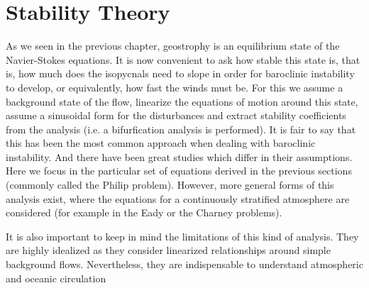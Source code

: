 \section{Stability Theory}
\label{s:stability}

As we seen in the previous chapter, geostrophy is an equilibrium state of the Navier-Stokes equations. It is now convenient to ask how stable this state is, that is, how much does the isopycnals need to slope in order for baroclinic instability to develop, or equivalently, how fast the winds must be. For this we assume a background state of the flow, linearize the equations of motion around this state, assume a sinusoidal form for the disturbances and extract stability coefficients from the analysis (i.e. a bifurfication analysis is performed). It is fair to say that this has been the most common approach when dealing with baroclinic instability. And there have been great studies which differ in their assumptions. Here we focus in the particular set of equations derived in the previous sections (commonly called the Philip problem). However, more general forms of this analysis exist, where the equations for a continuously stratified atmosphere are considered (for example in the Eady or the Charney problems).

It is also important to keep in mind the limitations of this kind of analysis. They are highly idealized as they consider linearized relationships around simple background flows. Nevertheless, they are indispensable to understand atmospheric and oceanic circulation

